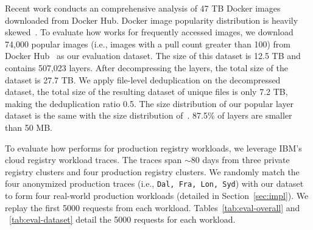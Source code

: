Recent work \cite{analysisdockergithub} conducts an comprehensive analysis of 47 TB Docker images downloaded from Docker Hub. 
Docker image popularity distribution is heavily skewed~\cite{analysisdockergithub}.
To evaluate how \sysname works for frequently accessed images, 
we download 74,000 popular images (i.e., images with a pull count greater than 100) from Docker Hub~\cite{docker-hub} as our evaluation dataset. 
The size of this dataset is 12.5 TB and contains 507,023 layers. 
After decompressing the layers, the total size of the dataset is 27.7 TB.
We apply file-level deduplication on the decompressed dataset, 
the total size of the resulting dataset of unique files is only 7.2 TB, making the deduplication ratio 0.5.
The size distribution of our popular layer dataset is the same with 
the size distribution of~\cite{analysisdockergithub}.
87.5\% of layers are smaller than 50 MB.
  
To evaluate how \sysname performs for production registry workloads, 
we leverage IBM's cloud registry workload traces\cite{dockerworkload}. 
The traces span $\sim$80 days from three private registry clusters and four production registry clusters. 
We randomly match the four anonymized production traces (i.e., \texttt{Dal, Fra, Lon, Syd}) 
with our dataset to form four real-world production workloads (detailed in Section~\ref{sec:impl}). 
We replay the first 5000 requests from each workload.
Tables~\ref{tab:eval-overall} and ~\ref{tab:eval-dataset} detail the 5000 requests for each workload.




%
%